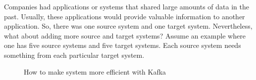 Companies had applications or systems that shared large amounts of data in the past.
Usually, these applications would provide valuable information to another application.
So, there was one source system and one target system.
Nevertheless, what about adding more source and target systems?
Assume an example where one has five source systems and five target systems.
Each source system needs something from each particular target system.
\begin{figure}[ht!]
    \hspace{0.01\textwidth}
    \hspace{0.01\textwidth}
    \hspace{0.01\textwidth}
    \caption{How to make system more efficient with Kafka}
    \label{fig:withoutAndWithBroker}
\end{figure}

